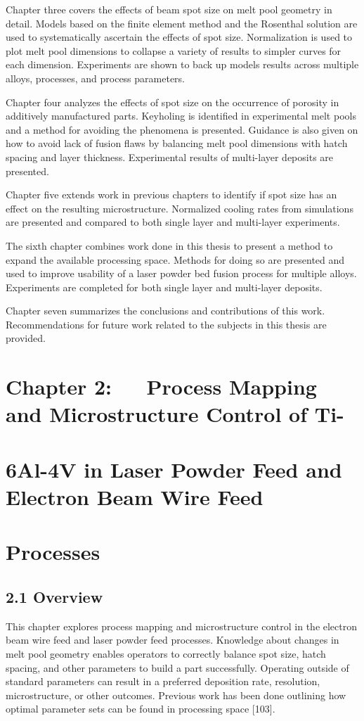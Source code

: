 \documentclass[10pt]{article}
\begin{document}
Chapter three covers the effects of beam spot size on melt pool geometry in detail. Models based on the finite element method and the Rosenthal solution are used to systematically ascertain the effects of spot size. Normalization is used to plot melt pool dimensions to collapse a variety of results to simpler curves for each dimension. Experiments are shown to back up models results across multiple alloys, processes, and process parameters.

Chapter four analyzes the effects of spot size on the occurrence of porosity in additively manufactured parts. Keyholing is identified in experimental melt pools and a method for avoiding the phenomena is presented. Guidance is also given on how to avoid lack of fusion flaws by balancing melt pool dimensions with hatch spacing and layer thickness. Experimental results of multi-layer deposits are presented.

Chapter five extends work in previous chapters to identify if spot size has an effect on the resulting microstructure. Normalized cooling rates from simulations are presented and compared to both single layer and multi-layer experiments.

The sixth chapter combines work done in this thesis to present a method to expand the available processing space. Methods for doing so are presented and used to improve usability of a laser powder bed fusion process for multiple alloys. Experiments are completed for both single layer and multi-layer deposits.

Chapter seven summarizes the conclusions and contributions of this work. Recommendations for future work related to the subjects in this thesis are provided.

\section*{Chapter 2: $\quad$ Process Mapping and Microstructure Control of Ti-}
\section*{6Al-4V in Laser Powder Feed and Electron Beam Wire Feed}
\section*{Processes}
\subsection*{2.1 Overview}
This chapter explores process mapping and microstructure control in the electron beam wire feed and laser powder feed processes. Knowledge about changes in melt pool geometry enables operators to correctly balance spot size, hatch spacing, and other parameters to build a part successfully. Operating outside of standard parameters can result in a preferred deposition rate, resolution, microstructure, or other outcomes. Previous work has been done outlining how optimal parameter sets can be found in processing space [103].
\end{document}
